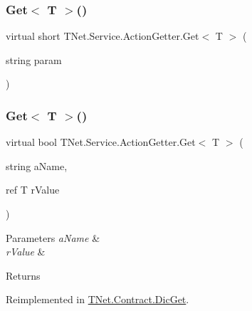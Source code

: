 \subsubsection{\texorpdfstring{Get$<$ T $>$()}{Get< T >()}\hspace{0.1cm}{\footnotesize\ttfamily [1/2]}}
{\footnotesize\ttfamily virtual short T\+Net.\+Service.\+Action\+Getter.\+Get$<$ T $>$ (\begin{DoxyParamCaption}\item[{string}]{param }\end{DoxyParamCaption})\hspace{0.3cm}{\ttfamily [virtual]}}





\mbox{\label{class_t_net_1_1_service_1_1_action_getter_a1e62c4e643e9b9d0302275b6fa5d8ad1}} 
\subsubsection{\texorpdfstring{Get$<$ T $>$()}{Get< T >()}\hspace{0.1cm}{\footnotesize\ttfamily [2/2]}}
{\footnotesize\ttfamily virtual bool T\+Net.\+Service.\+Action\+Getter.\+Get$<$ T $>$ (\begin{DoxyParamCaption}\item[{string}]{a\+Name,  }\item[{ref T}]{r\+Value }\end{DoxyParamCaption})\hspace{0.3cm}{\ttfamily [virtual]}}






\begin{DoxyParams}{Parameters}
{\em a\+Name} & \\
\hline
{\em r\+Value} & \\
\hline
\end{DoxyParams}
\begin{DoxyReturn}{Returns}

\end{DoxyReturn}


Reimplemented in \mbox{\hyperlink{class_t_net_1_1_contract_1_1_dic_get_a606c222e0ea4d6e26cb982db25395419}{T\+Net.\+Contract.\+Dic\+Get}}.

